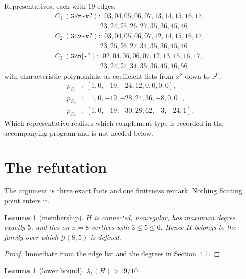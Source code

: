 \documentclass[11pt]{amsart}
\newtheorem{lemma}[theorem]{Lemma}
\theoremstyle{definition}
\begin{document}
Representatives, each with $19$ edges:
\[
\begin{array}{l}
C_1\ (\texttt{GFz\textasciitilde{}v?}):\ \,
03,04,05,06,07,13,14,15,16,17,\\
\qquad\qquad\qquad\ \ 23,24,25,26,27,35,36,45,46\\[3pt]
C_2\ (\texttt{GLv\textasciitilde{}v?}):\ \,
03,04,05,06,07,12,14,15,16,17,\\
\qquad\qquad\qquad\ \ 23,25,26,27,34,35,36,45,46\\[3pt]
C_3\ (\texttt{GZn]\textasciitilde{}?}):\ \,
02,04,05,06,07,12,13,15,16,17,\\
\qquad\qquad\qquad\ \ 23,24,27,34,35,36,45,46,56
\end{array}
\]
with characteristic polynomials, as coefficient lists from $x^8$ down to $x^0$,
\begin{equation}\label{eq:pC}
\begin{aligned}
p_{C_1}&:\ [1,0,-19,-24,12,0,0,0,0],\\
p_{C_2}&:\ [1,0,-19,-28,24,36,-8,0,0],\\
p_{C_3}&:\ [1,0,-19,-30,28,62,-3,-24,1].
\end{aligned}
\end{equation}
Which representative realises which complement type is recorded in the
accompanying program and is not needed below.

\section{The refutation}

The argument is three exact facts and one finiteness remark. Nothing
floating point enters it.

\begin{lemma}[membership]\label{lem:member}
$H$ is connected, nonregular, has maximum degree exactly $5$, and lies on $n=8$
vertices with $3\le 5\le 6$. Hence $H$ belongs to the family over which
$\mathcal{G}(8,5)$ is defined.
\end{lemma}

\begin{proof}
Immediate from the edge list and the degrees in Section~4.1.
\end{proof}

\begin{lemma}[lower bound]\label{lem:lower}
$\lambda_1(H)>49/10$.
\end{lemma}
\end{document}

